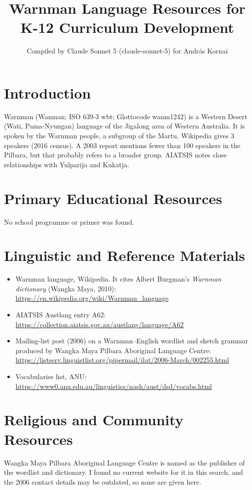 \documentclass[12pt]{article}
\title{Warnman Language Resources for K-12 Curriculum Development}
\author{Compiled by Claude Sonnet 5 (claude-sonnet-5) for Andr\'as Kornai}
\date{}
\begin{document}
\maketitle

\section{Introduction}
Warnman (Wanman; ISO 639-3 wbt; Glottocode wanm1242) is a Western Desert (Wati, Pama-Nyungan) language of the Jigalong area of Western Australia. It is spoken by the Warnman people, a subgroup of the Martu. Wikipedia gives 3 speakers (2016 census). A 2003 report mentions fewer than 100 speakers in the Pilbara, but that probably refers to a broader group. AIATSIS notes close relationships with Yulparija and Kukatja.

\section{Primary Educational Resources}
No school programme or primer was found.

\section{Linguistic and Reference Materials}
\begin{itemize}
\item Warnman language, Wikipedia. It cites Albert Burgman's \emph{Warnman dictionary} (Wangka Maya, 2010): \url{https://en.wikipedia.org/wiki/Warnman_language}
\item AIATSIS Austlang entry A62: \url{https://collection.aiatsis.gov.au/austlang/language/A62}
\item Mailing-list post (2006) on a Warnman--English wordlist and sketch grammar produced by Wangka Maya Pilbara Aboriginal Language Centre: \url{https://listserv.linguistlist.org/pipermail/ilat/2006-March/002255.html}
\item Vocabularies list, ANU: \url{https://www0.anu.edu.au/linguistics/nash/aust/dsd/vocabs.html}
\end{itemize}

\section{Religious and Community Resources}
Wangka Maya Pilbara Aboriginal Language Centre is named as the publisher of the wordlist and dictionary. I found no current website for it in this search, and the 2006 contact details may be outdated, so none are given here.
\end{document}
